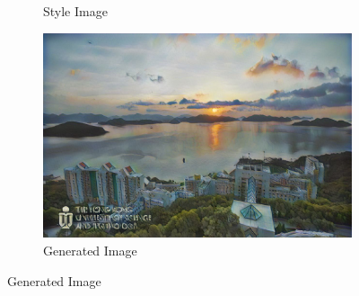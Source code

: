 \documentclass{article}
\begin{document}
\begin{figure}[ht]
\begin{minipage}{\textwidth}
\begin{subfigure}{0.25\textwidth}
            \caption{Style Image}
        \end{subfigure}
        \hfill %
        \begin{subfigure}{0.25\textwidth}
            \includegraphics[width=\textwidth]{./part1_inference/output_2_camille-corot_toulon-battleships-dismantled.jpg}
            \caption{Generated Image}
        \end{subfigure}
    \end{minipage}
    
    \vspace{0.1cm}


\end{figure}
\end{document}
